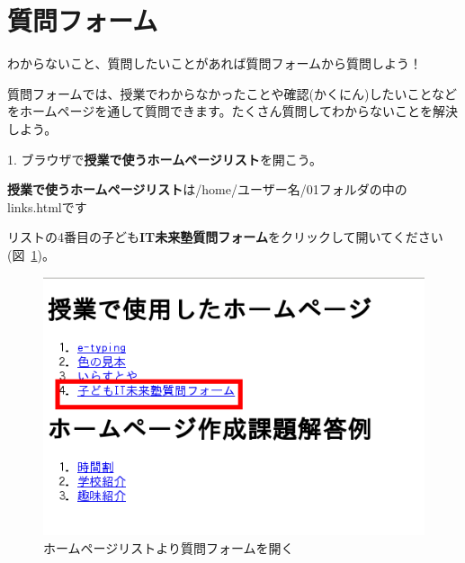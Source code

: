 \newpage
\section{質問フォーム}

わからないこと、質問したいことがあれば質問フォームから質問しよう！

質問フォームでは、授業でわからなかったことや確認(かくにん)したいことなどをホームページを通して質問できます。たくさん質問してわからないことを解決しよう。

1.
ブラウザで\textbf{授業で使うホームページリスト}を開こう。

\textbf{授業で使うホームページリスト}は/home/ユーザー名/01フォルダの中のlinks.htmlです

リストの4番目の子ども\textbf{IT未来塾質問フォーム}をクリックして開いてください(図~\ref{fig:open_question_form})。


\begin{description}
    \item {}
\end{description}



\begin{figure}[H]
  
    \begin{center}
      
      \includegraphics[width=11.231cm,height=7.613cm]{text04-img/textbook-img245.png}
      \caption{\label{fig:open_question_form}ホームページリストより質問フォームを開く}
    \end{center}
    
\end{figure}

